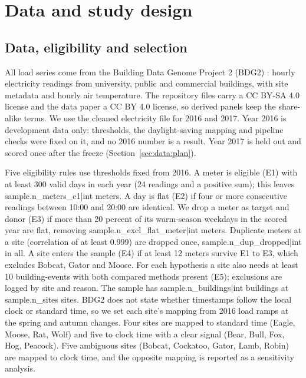 \section{Data and study design}
\label{sec:data}

\subsection{Data, eligibility and selection}
\label{sec:data:sample}

All load series come from the Building Data Genome Project 2 (BDG2) \citep{miller2020bdg2}: hourly electricity readings from university, public and commercial buildings, with site metadata and hourly air temperature. The repository files \citep{bdg2repo} carry a CC BY-SA 4.0 license and the data paper a CC BY 4.0 license, so derived panels keep the share-alike terms. We use the cleaned electricity file for 2016 and 2017. Year 2016 is development data only: thresholds, the daylight-saving mapping and pipeline checks were fixed on it, and no 2016 number is a result. Year 2017 is held out and scored once after the freeze (Section~\ref{sec:data:plan}).

Five eligibility rules use thresholds fixed from 2016. A meter is eligible (E1) with at least 300 valid days in each year (24 readings and a positive sum); this leaves {{sample.n_meters_e1|int}} meters. A day is flat (E2) if four or more consecutive readings between 10:00 and 20:00 are identical. We drop a meter as target and donor (E3) if more than 20 percent of its warm-season weekdays in the scored year are flat, removing {{sample.n_excl_flat_meter|int}} meters. Duplicate meters at a site (correlation of at least 0.999) are dropped once, {{sample.n_dup_dropped|int}} in all. A site enters the sample (E4) if at least 12 meters survive E1 to E3, which excludes Bobcat, Gator and Moose. For each hypothesis a site also needs at least 10 building-events with both compared methods present (E5); exclusions are logged by site and reason. The sample has {{sample.n_buildings|int}} buildings at {{sample.n_sites}} sites. BDG2 does not state whether timestamps follow the local clock or standard time, so we set each site's mapping from 2016 load ramps at the spring and autumn changes. Four sites are mapped to standard time (Eagle, Moose, Rat, Wolf) and five to clock time with a clear signal (Bear, Bull, Fox, Hog, Peacock). Five ambiguous sites (Bobcat, Cockatoo, Gator, Lamb, Robin) are mapped to clock time, and the opposite mapping is reported as a sensitivity analysis.

